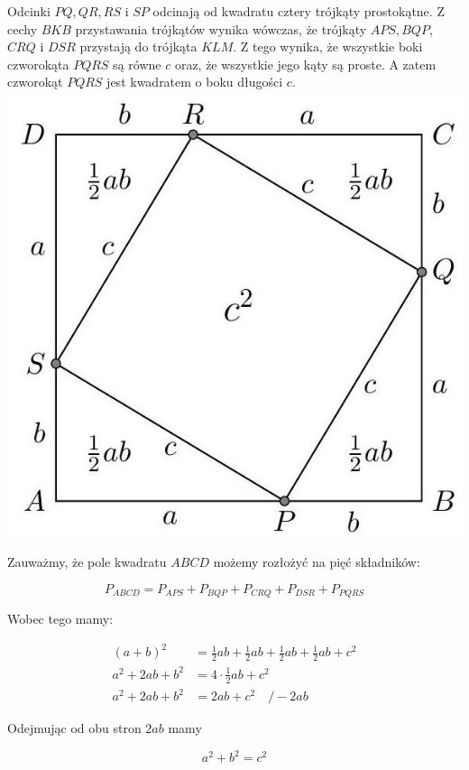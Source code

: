 \documentclass[10pt]{article}
\begin{document}
Odcinki \(P Q, Q R, R S\) i \(S P\) odcinają od kwadratu cztery trójkąty prostokątne. Z cechy \(B K B\) przystawania trójkątów wynika wówczas, że trójkąty \(A P S, B Q P\), \(C R Q\) i \(D S R\) przystają do trójkąta \(K L M\). Z tego wynika, że wszystkie boki czworokąta \(P Q R S\) są równe \(c\) oraz, że wszystkie jego kąty są proste. A zatem czworokąt \(P Q R S\) jest kwadratem o boku długości \(c\).\\
\includegraphics[max width=\textwidth, center]{2024_11_21_71f62bd117d375398909g-122}

Zauważmy, że pole kwadratu \(A B C D\) możemy rozłożyć na pięć składników:

\[
P_{A B C D}=P_{A P S}+P_{B Q P}+P_{C R Q}+P_{D S R}+P_{P Q R S}
\]

Wobec tego mamy:

\[
\begin{aligned}
(a+b)^{2} & =\frac{1}{2} a b+\frac{1}{2} a b+\frac{1}{2} a b+\frac{1}{2} a b+c^{2} \\
a^{2}+2 a b+b^{2} & =4 \cdot \frac{1}{2} a b+c^{2} \\
a^{2}+2 a b+b^{2} & =2 a b+c^{2} \quad /-2 a b
\end{aligned}
\]

Odejmując od obu stron \(2 a b\) mamy

\[
a^{2}+b^{2}=c^{2}
\]
\end{document}
